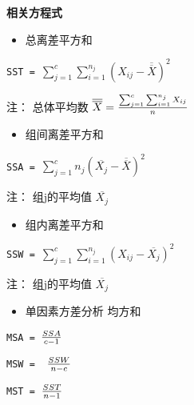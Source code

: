\documentclass{book}        %
\date{}
\providecommand{\tightlist}{%
  \setlength{\itemsep}{0pt}\setlength{\parskip}{0pt}}
\begin{document}
\textbf{相关方程式}

\begin{itemize}
\tightlist
\item
  总离差平方和\\
\end{itemize}

\texttt{SST~=~}\(\sum_{j=1}^c \sum_{i=1}^{n_j} (X_{ij} - \overline{\overline{X}})^2\)


\begin{description}
\tightlist
\item[]
注： 总体平均数
\(\overline{\overline{X}} = {\sum_{j=1}^c \sum_{i=1}^{n_j} X_{ij} \over n }\)
\end{description}


\begin{itemize}
\tightlist
\item
  组间离差平方和\\
\end{itemize}

\texttt{SSA~=~}\(\sum_{j=1}^c n_j(\overline{X_j} - \overline{\overline{X}})^2\)


\begin{description}
\tightlist
\item[]
注： 组j的平均值 \(\overline{X_j}\)
\end{description}


\begin{itemize}
\tightlist
\item
  组内离差平方和\\
\end{itemize}

\texttt{SSW~=~}\(\sum_{j=1}^c \sum_{i=1}^{n_j} (X_{ij} - \overline{X_j})^2\)


\begin{description}
\tightlist
\item[]
注： 组j的平均值 \(\overline{X_j}\)
\end{description}


\begin{itemize}
\tightlist
\item
  单因素方差分析 均方和
\end{itemize}

\texttt{MSA~=~}\({SSA \over c -1}\)

\texttt{MSW~=~~}\({SSW \over n -c}\)

\texttt{MST~=~}\({SST \over n -1}\)
\end{document}
